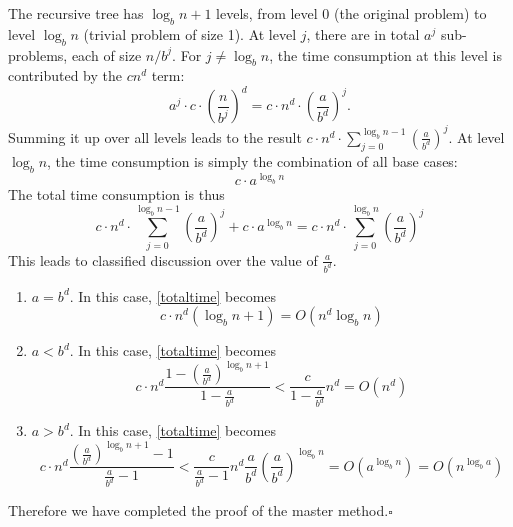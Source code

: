 The recursive tree has $\log_bn+1$ levels, from level 0 (the original problem) to level $\log_bn$ (trivial problem of size 1). At level $j$, there are in total $a^j$ sub-problems, each of size $n/b^j$. For $j\neq\log_bn$, the time consumption at this level is contributed by the $cn^d$ term:
\begin{equation*}
a^j\cdot c\cdot\left(\frac{n}{b^j}\right)^d=c\cdot n^d\cdot\left(\frac{a}{b^d}\right)^j.
\end{equation*}
Summing it up over all levels leads to the result $c\cdot n^d\cdot\sum\limits_{j=0}^{\log_bn-1}\left(\frac{a}{b^d}\right)^j$. At level $\log_bn$, the time consumption is simply the combination of all base cases:
\begin{equation*}
c\cdot a^{\log_bn}
\end{equation*}
The total time consumption is thus 
\begin{equation}\label{totaltime}
c\cdot n^d\cdot\sum\limits_{j=0}^{\log_bn-1}\left(\frac{a}{b^d}\right)^j+c\cdot a^{\log_bn}=c\cdot n^d\cdot\sum\limits_{j=0}^{\log_bn}\left(\frac{a}{b^d}\right)^j
\end{equation}
This leads to classified discussion over the value of $\frac{a}{b^d}$.
\begin{enumerate}
\item $a=b^d$. In this case, \eqref{totaltime} becomes 
\begin{equation*}
c\cdot n^d(\log_bn+1)=O(n^d\log_bn)
\end{equation*}
\item $a<b^d$. In this case, \eqref{totaltime} becomes 
\begin{equation*}
c\cdot n^d\frac{1-\left(\frac{a}{b^d}\right)^{\log_bn+1}}{1-\frac{a}{b^d}}<\frac{c}{1-\frac{a}{b^d}}n^d=O(n^d)
\end{equation*}
\item $a>b^d$. In this case, \eqref{totaltime} becomes 
\begin{equation*}
c\cdot n^d\frac{\left(\frac{a}{b^d}\right)^{\log_bn+1}-1}{\frac{a}{b^d}-1}<\frac{c}{\frac{a}{b^d}-1}n^d\frac{a}{b^d}\left(\frac{a}{b^d}\right)^{\log_bn}=O(a^{\log_bn})=O(n^{\log_ba})
\end{equation*}
\end{enumerate}
Therefore we have completed the proof of the master method.\hfill$\square$

